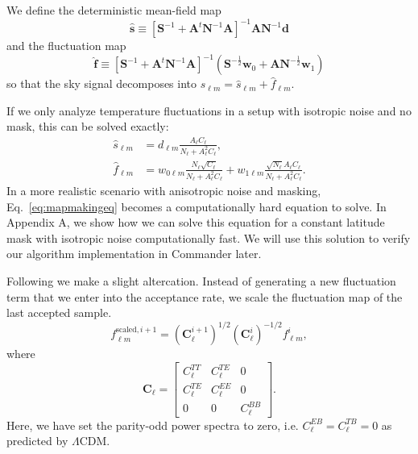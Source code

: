 \documentclass[twocolumn]{../common/aa}
\def\LCDM{$\Lambda$CDM}
\begin{document}
We define the deterministic mean-field map
\begin{equation}
\hat{\textbf{s}} \equiv \left[\mathbf{S}^{-1} + \mathbf{A}^t \mathbf{N}^{-1}\mathbf{A} \right]^{-1} \mathbf{A} \mathbf{N}^{-1} \mathbf{d}
\end{equation}
and the fluctuation map
\begin{equation}
\hat{\textbf{f}} \equiv \left[\mathbf{S}^{-1} + \mathbf{A}^t \mathbf{N}^{-1}\mathbf{A} \right]^{-1} \left(\mathbf{S}^{-\frac{1}{2}}\mathbf{w}_0 +\mathbf{A N}^{-\frac{1}{2}}\mathbf{w}_1 \right)
\end{equation}
so that the sky signal decomposes into $s_{\ell m} = \hat{s}_{\ell m} + \hat{f}_{\ell m}$.

If we only analyze temperature fluctuations in a setup with isotropic noise and no mask, this can be solved exactly:
\begin{align}
    \hat{s}_{\ell m} &= d_{\ell m}\frac{A_{\ell}C_{\ell}}{N_\ell + A_{\ell}^2C_{\ell}},\\
    \hat{f}_{\ell m} &= w_{0\ell m}\frac{N_{\ell}\sqrt{C_{\ell}}}{N_\ell + A_{\ell}^2C_{\ell}}+w_{1\ell m}\frac{\sqrt{N_{\ell}}A_{\ell}C_\ell}{N_\ell + A_{\ell}^2C_{\ell}}.
\end{align}
In a more realistic scenario with anisotropic noise and masking, Eq.~\eqref{eq:mapmakingeq} becomes a computationally hard equation to solve. In Appendix A, we show how we can solve this equation for a constant latitude mask with isotropic noise computationally fast. We will use this solution to verify our algorithm implementation in Commander later.

Following \cite{racine:2016} we make a slight altercation. Instead of generating a new fluctuation term that we enter into the acceptance rate, we scale the fluctuation map of the last accepted sample.
\begin{equation}
    f_{\ell m}^{\textrm{scaled}, i+1} = \left(\textbf{C}^{i+1}_{\ell}\right)^{1/2}\left(\textbf{C}^{i}_{\ell}\right)^{-1/2} f_{\ell m}^{i},
\end{equation}
where
\begin{equation}
\textbf{C}_{\ell} = \begin{bmatrix}
C^{TT}_\ell & C^{TE}_\ell & 0\\
C^{TE}_\ell & C^{EE}_\ell & 0\\
0 & 0 & C^{BB}_\ell
\end{bmatrix}.
\end{equation}
Here, we have set the parity-odd power spectra to zero, i.e. $C^{EB}_\ell =C^{TB}_\ell = 0$ as predicted by \LCDM.
\end{document}
